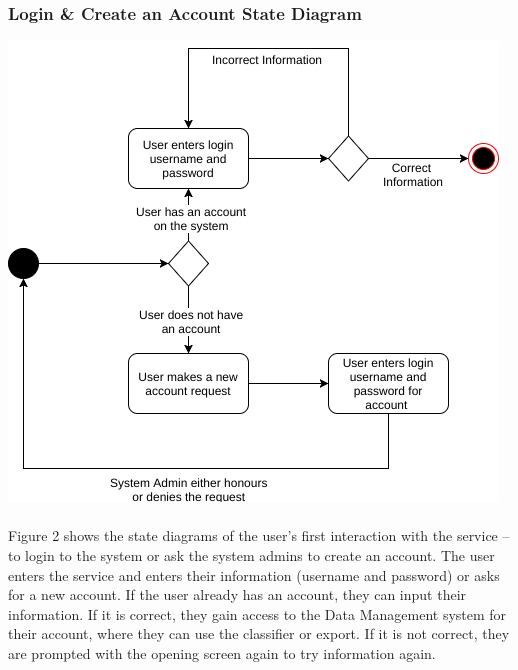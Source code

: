 \documentclass[12pt,oneside,letterpaper]{article}
\begin{document}
\subsubsection{Login \& Create an Account State Diagram}
\includegraphics[scale = 0.7]{Veazey_Login_State.png}
\begingroup
{}
\endgroup

\paragraph{} Figure 2 shows the state diagrams of the user's first interaction with the service -- to login to the system or ask the system admins to create an account. The user enters the service and enters their information (username and password) or asks for a new account. If the user already has an account, they can input their information. If it is correct, they gain access to the Data Management system for their account, where they can use the classifier or export. If it is not correct, they are prompted with the opening screen again to try information again.
\end{document}
